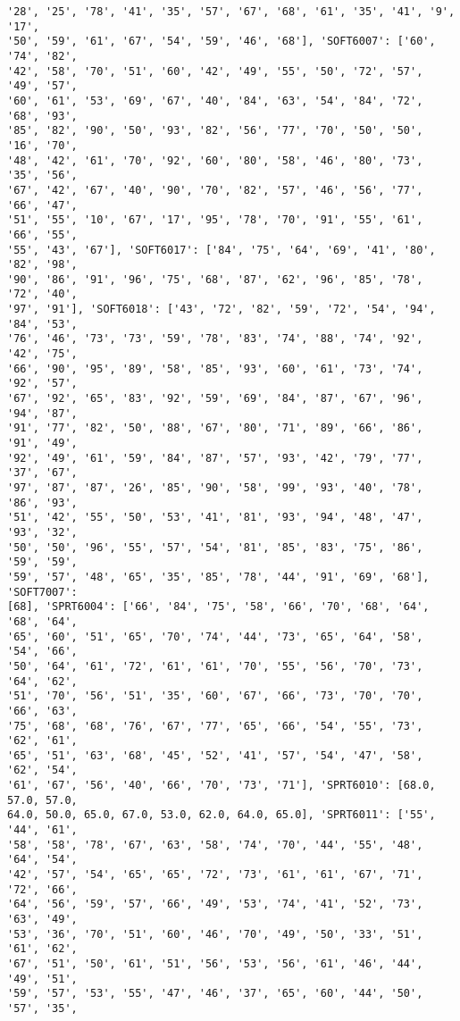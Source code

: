 \documentclass[11pt]{article}
\begin{document}
\begin{Verbatim}[commandchars=\\\{\}]
'28', '25', '78', '41', '35', '57', '67', '68', '61', '35', '41', '9', '17',
'50', '59', '61', '67', '54', '59', '46', '68'], 'SOFT6007': ['60', '74', '82',
'42', '58', '70', '51', '60', '42', '49', '55', '50', '72', '57', '49', '57',
'60', '61', '53', '69', '67', '40', '84', '63', '54', '84', '72', '68', '93',
'85', '82', '90', '50', '93', '82', '56', '77', '70', '50', '50', '16', '70',
'48', '42', '61', '70', '92', '60', '80', '58', '46', '80', '73', '35', '56',
'67', '42', '67', '40', '90', '70', '82', '57', '46', '56', '77', '66', '47',
'51', '55', '10', '67', '17', '95', '78', '70', '91', '55', '61', '66', '55',
'55', '43', '67'], 'SOFT6017': ['84', '75', '64', '69', '41', '80', '82', '98',
'90', '86', '91', '96', '75', '68', '87', '62', '96', '85', '78', '72', '40',
'97', '91'], 'SOFT6018': ['43', '72', '82', '59', '72', '54', '94', '84', '53',
'76', '46', '73', '73', '59', '78', '83', '74', '88', '74', '92', '42', '75',
'66', '90', '95', '89', '58', '85', '93', '60', '61', '73', '74', '92', '57',
'67', '92', '65', '83', '92', '59', '69', '84', '87', '67', '96', '94', '87',
'91', '77', '82', '50', '88', '67', '80', '71', '89', '66', '86', '91', '49',
'92', '49', '61', '59', '84', '87', '57', '93', '42', '79', '77', '37', '67',
'97', '87', '87', '26', '85', '90', '58', '99', '93', '40', '78', '86', '93',
'51', '42', '55', '50', '53', '41', '81', '93', '94', '48', '47', '93', '32',
'50', '50', '96', '55', '57', '54', '81', '85', '83', '75', '86', '59', '59',
'59', '57', '48', '65', '35', '85', '78', '44', '91', '69', '68'], 'SOFT7007':
[68], 'SPRT6004': ['66', '84', '75', '58', '66', '70', '68', '64', '68', '64',
'65', '60', '51', '65', '70', '74', '44', '73', '65', '64', '58', '54', '66',
'50', '64', '61', '72', '61', '61', '70', '55', '56', '70', '73', '64', '62',
'51', '70', '56', '51', '35', '60', '67', '66', '73', '70', '70', '66', '63',
'75', '68', '68', '76', '67', '77', '65', '66', '54', '55', '73', '62', '61',
'65', '51', '63', '68', '45', '52', '41', '57', '54', '47', '58', '62', '54',
'61', '67', '56', '40', '66', '70', '73', '71'], 'SPRT6010': [68.0, 57.0, 57.0,
64.0, 50.0, 65.0, 67.0, 53.0, 62.0, 64.0, 65.0], 'SPRT6011': ['55', '44', '61',
'58', '58', '78', '67', '63', '58', '74', '70', '44', '55', '48', '64', '54',
'42', '57', '54', '65', '65', '72', '73', '61', '61', '67', '71', '72', '66',
'64', '56', '59', '57', '66', '49', '53', '74', '41', '52', '73', '63', '49',
'53', '36', '70', '51', '60', '46', '70', '49', '50', '33', '51', '61', '62',
'67', '51', '50', '61', '51', '56', '53', '56', '61', '46', '44', '49', '51',
'59', '57', '53', '55', '47', '46', '37', '65', '60', '44', '50', '57', '35',

\end{Verbatim}
\end{document}
